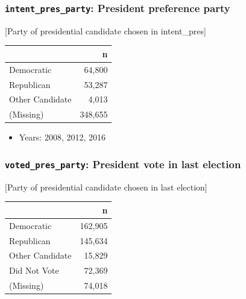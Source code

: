 \documentclass[10pt,article,oneside]{memoir}
\theoremstyle{definition}
\begin{document}
\hypertarget{intent_pres_party-president-preference-party}{%
\subsubsection{\texorpdfstring{\texttt{intent\_pres\_party}: President
preference
party}{intent\_pres\_party: President preference party}}\label{intent_pres_party-president-preference-party}}

{[}Party of presidential candidate chosen in intent\_pres{]}

\begin{table}[H]
\centering
\begin{tabular}{lr}
\toprule
 & n\\
\midrule
Democratic & 64,800\\
Republican & 53,287\\
Other Candidate & 4,013\\
(Missing) & 348,655\\
\bottomrule
\end{tabular}
\end{table}

\begin{itemize}
\tightlist
\item
  Years: 2008, 2012, 2016
\end{itemize}

\hypertarget{voted_pres_party-president-vote-in-last-election}{%
\subsubsection{\texorpdfstring{\texttt{voted\_pres\_party}: President
vote in last
election}{voted\_pres\_party: President vote in last election}}\label{voted_pres_party-president-vote-in-last-election}}

{[}Party of presidential candidate chosen in last election{]}

\begin{table}[H]
\centering
\begin{tabular}{lr}
\toprule
 & n\\
\midrule
Democratic & 162,905\\
Republican & 145,634\\
Other Candidate & 15,829\\
Did Not Vote & 72,369\\
(Missing) & 74,018\\
\bottomrule
\end{tabular}
\end{table}
\end{document}
